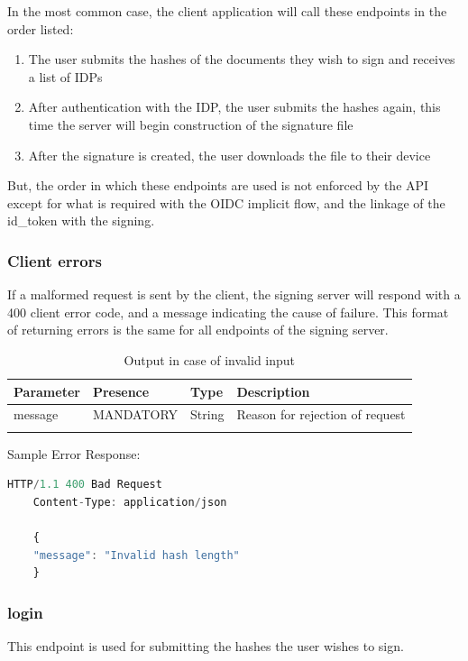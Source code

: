 In the most common case, the client application will call these endpoints in the order listed:
\begin{enumerate}
    \item The user submits the hashes of the documents they wish to sign and receives a list of IDPs
    \item After authentication with the IDP, the user submits the hashes again, this time the server will begin construction of the signature file
    \item After the signature is created, the user downloads the file to their device
\end{enumerate}

But, the order in which these endpoints are used is not enforced by the API except for what is required with the \gls{OIDC} implicit flow,
and the linkage of the id\_token with the signing.

\subsubsection{Client errors}
\label{apiclienterrors}
If a malformed request is sent by the client, the signing server will respond with a 400 client error code,
and a message indicating the cause of failure.
This format of returning errors is the same for all endpoints of the signing server.

\begin{longtable}{|l|l|l|l|}
    \hline
    \textbf{Parameter} & \textbf{Presence} & \textbf{Type} & \textbf{Description} \\ \hline
    message & MANDATORY & String & Reason for rejection of request \\ \hline
    \caption{Output in case of invalid input}
\end{longtable}

Sample Error Response:
\begin{lstlisting}[caption={Error response}, captionpos=b, language=JavaScript, label={lst:errorresponse}]
    HTTP/1.1 400 Bad Request
    Content-Type: application/json

    {
    "message": "Invalid hash length"
    }
\end{lstlisting}

\subsubsection{login}
This endpoint is used for submitting the hashes the user wishes to sign.

